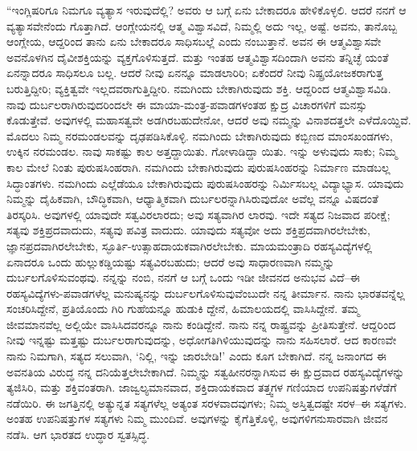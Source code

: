 “ಇಂಗ್ಲಿಷರಿಗೂ ನಿಮಗೂ ವ್ಯತ್ಯಾಸ ಇರುವುದೆಲ್ಲಿ? ಅವರು ಆ ಬಗ್ಗೆ ಏನು ಬೇಕಾದರೂ ಹೇಳಿಕೊಳ್ಳಲಿ. ಆದರೆ ನನಗೆ ಆ ವ್ಯತ್ಯಾಸವೇನೆಂದು ಗೊತ್ತಾಗಿದೆ. ಆಂಗ್ಲೇಯನಲ್ಲಿ ಆತ್ಮ ವಿಶ್ವಾಸವಿದೆ, ನಿಮ್ಮಲ್ಲಿ ಅದು ಇಲ್ಲ, ಅಷ್ಟೆ. ಅವನು, ತಾನೊಬ್ಬ ಆಂಗ್ಲೇಯ, ಆದ್ದರಿಂದ ತಾನು ಏನು ಬೇಕಾದರೂ ಸಾಧಿಸಬಲ್ಲೆ ಎಂದು ನಂಬುತ್ತಾನೆ. ಅವನ ಈ ಆತ್ಮವಿಶ್ವಾಸವೇ ಅವನೊಳಗಿನ ದೈವೀಶಕ್ತಿಯನ್ನು ವ್ಯಕ್ತಗೊಳಿಸುತ್ತದೆ. ಮತ್ತು ಇಂತಹ ಆತ್ಮವಿಶ್ವಾಸದಿಂದಾಗಿ ಅವನು ತನ್ನಿಚ್ಛೆ ಯಂತೆ ಏನನ್ನಾದರೂ ಸಾಧಿಸಲೂ ಬಲ್ಲ. ಆದರೆ ನೀವು ಏನನ್ನೂ ಮಾಡಲಾರಿರಿ; ಏಕೆಂದರೆ ನೀವು ನಿಷ್ಪ್ರಯೋಜಕರಾಗುತ್ತ ಬರುತ್ತಿದ್ದೀರಿ; ವ್ಯಕ್ತಿತ್ವವೇ ಇಲ್ಲದವರಾಗುತ್ತಿದ್ದೀರಿ. ನಮಗಿಂದು ಬೇಕಾಗಿರುವುದು ಶಕ್ತಿ. ಆದ್ದರಿಂದ ಆತ್ಮವಿಶ್ವಾಸವಿಡಿ. ನಾವು ದುರ್ಬಲರಾಗಿರುವುದರಿಂದಲೇ ಈ ಮಾಯಾ-ಮಂತ್ರ-ಪವಾಡಗಳಂತಹ ಕ್ಷುದ್ರ ವಿಚಾರಗಳಿಗೆ ಮನಸ್ಸು ಕೊಡುತ್ತೇವೆ. ಅವುಗಳಲ್ಲಿ ಮಹಾಸತ್ವವೇ ಅಡಗಿರಬಹುದೇನೋ, ಆದರೆ ಅವು ನಮ್ಮನ್ನು ವಿನಾಶದತ್ತಲೇ ಎಳೆದೊಯ್ದಿವೆ. ಮೊದಲು ನಿಮ್ಮ ನರಮಂಡಲವನ್ನು ದೃಢಪಡಿಸಿಕೊಳ್ಳಿ. ನಮಗಿಂದು ಬೇಕಾಗಿರುವುದು ಕಬ್ಬಿಣದ ಮಾಂಸಖಂಡಗಳು, ಉಕ್ಕಿನ ನರಮಂಡಲ. ನಾವು ಸಾಕಷ್ಟು ಕಾಲ ಅತ್ತದ್ದಾಯಿತು. ಗೋಳಾಡಿದ್ದಾ ಯಿತು. ಇನ್ನು ಅಳುವುದು ಸಾಕು; ನಿಮ್ಮ ಕಾಲ ಮೇಲೆ ನಿಂತು ಪುರುಷಸಿಂಹರಾಗಿ. ನಮಗಿಂದು ಬೇಕಾಗಿರುವುದು ಪುರುಷಸಿಂಹರನ್ನು ನಿರ್ಮಾಣ ಮಾಡಬಲ್ಲ ಸಿದ್ಧಾಂತಗಳು. ನಮಗಿಂದು ಎಲ್ಲೆಡೆಯೂ ಬೇಕಾಗಿರುವುದು ಪುರುಷಸಿಂಹರನ್ನು ನಿರ್ಮಿಸಬಲ್ಲ ವಿದ್ಯಾಭ್ಯಾಸ. ಯಾವುದು ನಿಮ್ಮನ್ನು ದೈಹಿಕವಾಗಿ, ಬೌದ್ಧಿಕವಾಗಿ, ಆಧ್ಯಾತ್ಮಿಕವಾಗಿ ದುರ್ಬಲರನ್ನಾಗಿಸಿರುವುದೋ ಅವೆಲ್ಲ ವನ್ನೂ ವಿಷದಂತೆ ತಿರಸ್ಕರಿಸಿ. ಅವುಗಳಲ್ಲಿ ಯಾವುದೇ ಸತ್ವವಿರಲಾರದು; ಅವು ಸತ್ಯವಾಗಿರ ಲಾರವು. ಇದೇ ಸತ್ಯದ ನಿಜವಾದ ಪರೀಕ್ಷೆ; ಸತ್ಯವು ಶಕ್ತಿಪ್ರದವಾದುದು, ಸತ್ಯವು ಪವಿತ್ರ ವಾದುದು. ಯಾವುದು ಸತ್ಯವೋ ಅದು ಶಕ್ತಿಪ್ರದವಾಗಿರಲೇಬೇಕು, ಜ್ಞಾನಪ್ರದವಾಗಿರಲೇಬೇಕು, ಸ್ಫೂರ್ತಿ-ಉತ್ಸಾಹದಾಯಕವಾಗಿರಲೇಬೇಕು. ಮಾಯಮಂತ್ರಾದಿ ರಹಸ್ಯವಿದ್ಯೆಗಳಲ್ಲಿ ಏನಾದರೂ ಒಂದು ಹುಲ್ಲುಕಡ್ಡಿಯಷ್ಟು ಸತ್ಯವಿರಬಹುದು; ಆದರೆ ಅವು ಸಾಧಾರಣವಾಗಿ ನಮ್ಮನ್ನು ದುರ್ಬಲಗೊಳಿಸುವಂಥವು. ನನ್ನನ್ನು ನಂಬಿ, ನನಗೆ ಆ ಬಗ್ಗೆ ಒಂದು ಇಡೀ ಜೀವನದ ಅನುಭವ ವಿದೆ–ಈ ರಹಸ್ಯವಿದ್ಯೆಗಳು-ಪವಾಡಗಳೆಲ್ಲ ಮನುಷ್ಯನನ್ನು ದುರ್ಬಲಗೊಳಿಸುವುವೆಂಬುದೇ ನನ್ನ ತೀರ್ಮಾನ. ನಾನು ಭಾರತವನ್ನೆಲ್ಲ ಸಂಚರಿಸಿದ್ದೇನೆ, ಪ್ರತಿಯೊಂದು ಗಿರಿ ಗುಹೆಯನ್ನೂ ಹುಡುಕಿ ದ್ದೇನೆ, ಹಿಮಾಲಯದಲ್ಲಿ ವಾಸಿಸಿದ್ದೇನೆ. ತಮ್ಮ ಜೀವಮಾನವೆಲ್ಲ ಅಲ್ಲಿಯೇ ವಾಸಿಸಿದವರನ್ನೂ ನಾನು ಕಂಡಿದ್ದೇನೆ. ನಾನು ನನ್ನ ರಾಷ್ಟ್ರವನ್ನು ಪ್ರೀತಿಸುತ್ತೇನೆ. ಆದ್ದರಿಂದ ನೀವು ಇನ್ನಷ್ಟು ಮತ್ತಷ್ಟು ದುರ್ಬಲರಾಗುವುದನ್ನು, ಅಧೋಗತಿಗಿಳಿಯುವುದನ್ನು ನಾನು ಸಹಿಸಲಾರೆ. ಆದ ಕಾರಣವೇ ನಾನು ನಿಮಗಾಗಿ, ಸತ್ಯದ ಸಲುವಾಗಿ, ‘ನಿಲ್ಲಿ, ಇನ್ನು ಜಾರಬೇಡಿ!’ ಎಂದು ಕೂಗ ಬೇಕಾಗಿದೆ. ನನ್ನ ಜನಾಂಗದ ಈ ಅವನತಿಯ ವಿರುದ್ಧ ನನ್ನ ದನಿಯೆತ್ತಲೇಬೇಕಾಗಿದೆ. ನಿಮ್ಮನ್ನು ಸತ್ವಹೀನರನ್ನಾಗಿಸುವ ಈ ಕ್ಷುದ್ರವಾದ ರಹಸ್ಯವಿದ್ಯೆಗಳನ್ನು ತ್ಯಜಿಸಿರಿ, ಮತ್ತು ಶಕ್ತಿವಂತರಾಗಿ. ಜಾಜ್ವಲ್ಯಮಾನವಾದ, ಶಕ್ತಿದಾಯಕವಾದ ತತ್ತ್ವಗಳ ಗಣಿಯಾದ ಉಪನಿಷತ್ತುಗಳೆಡೆಗೆ ನಡೆಯಿರಿ. ಈ ಜಗತ್ತಿನಲ್ಲಿ ಅತ್ಯುನ್ನತ ಸತ್ಯಗಳೆಲ್ಲ ಅತ್ಯಂತ ಸರಳವಾದವುಗಳು; ನಿಮ್ಮ ಅಸ್ತಿತ್ವದಷ್ಟೇ ಸರಳ–ಈ ಸತ್ಯಗಳು. ಅಂತಹ ಉಪನಿಷತ್ತುಗಳ ಸತ್ಯಗಳು ನಿಮ್ಮ ಮುಂದಿವೆ. ಅವುಗಳನ್ನು ಕೈಗೆತ್ತಿಕೊಳ್ಳಿ, ಅವುಗಳಿಗನುಸಾರವಾಗಿ ಜೀವನ ನಡೆಸಿ. ಆಗ ಭಾರತದ ಉದ್ಧಾರ ಸ್ವತಸ್ಸಿದ್ಧ.

